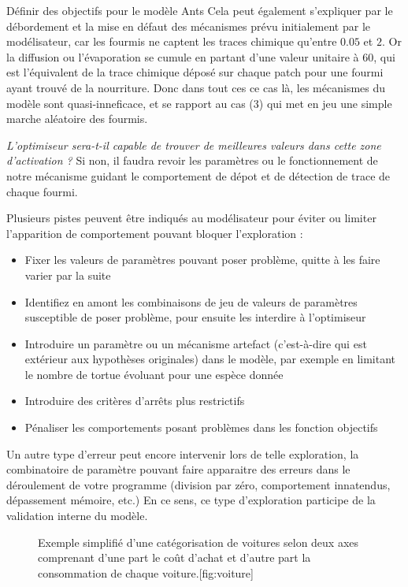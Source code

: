 \begin{testiv}{Définir des objectifs pour le modèle Ants}{}
Cela peut également s'expliquer par le débordement et la mise en défaut des mécanismes prévu initialement par le modélisateur, car les fourmis ne captent les traces chimique qu'entre $0.05$ et $2$. Or la diffusion ou l'évaporation se cumule en partant d'une valeur unitaire à $60$, qui est l'équivalent de la trace chimique déposé sur chaque patch pour une fourmi ayant trouvé de la nourriture. Donc dans tout ces ce cas là, les mécanismes du modèle sont quasi-inneficace, et se rapport au cas (3) qui met en jeu une simple marche aléatoire des fourmis.

\textit{L'optimiseur sera-t-il capable de trouver de meilleures valeurs dans cette zone d'activation ?} Si non, il faudra revoir les paramètres ou le fonctionnement de notre mécanisme guidant le comportement de dépot et de détection de trace de chaque fourmi.

Plusieurs pistes peuvent être indiqués au modélisateur pour éviter ou limiter l'apparition de comportement pouvant bloquer l'exploration :

\begin{itemize}[noitemsep,nolistsep]
	\item Fixer les valeurs de paramètres pouvant poser problème, quitte à les faire varier par la suite
	\item Identifiez en amont les combinaisons de jeu de valeurs de paramètres susceptible de poser problème, pour ensuite les interdire à l'optimiseur
	\item Introduire un paramètre ou un mécanisme artefact (c'est-à-dire qui est extérieur aux hypothèses originales) dans le modèle, par exemple en limitant le nombre de tortue évoluant pour une espèce donnée
	\item Introduire des critères d'arrêts plus restrictifs
	\item Pénaliser les comportements posant problèmes dans les fonction objectifs
\end{itemize}

Un autre type d'erreur peut encore intervenir lors de telle exploration, la combinatoire de paramètre pouvant faire apparaitre des erreurs dans le déroulement de votre programme (division par zéro, comportement innatendus, dépassement mémoire, etc.) En ce sens, ce type d'exploration participe de la validation interne du modèle.

\end{testiv}


\begin{figure}[!htbp]
	\begin{sidecaption}[fortoc]{Exemple simplifié d'une catégorisation de voitures selon deux axes comprenant d'une part le coût d'achat et d'autre part la consommation de chaque voiture.}[fig:voiture]
	\centering
	  \qquad
 \end{sidecaption}
\end{figure}


